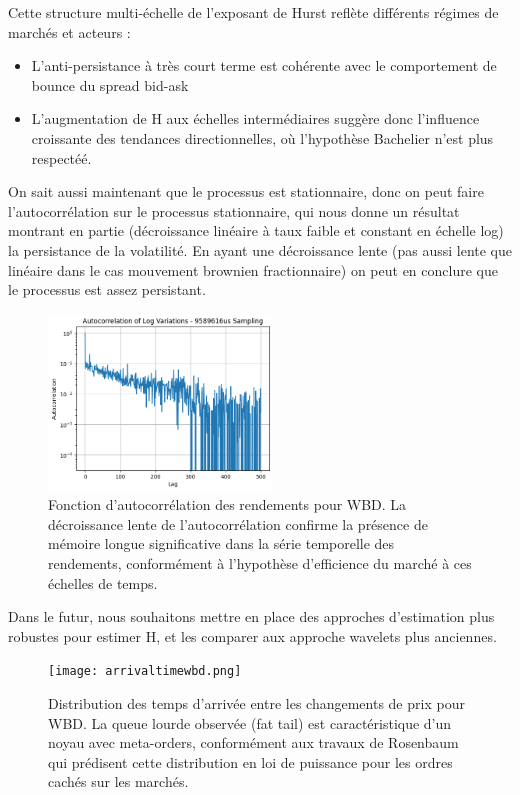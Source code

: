 \documentclass[10pt,a4paper]{article}
\theoremstyle{definition}
\theoremstyle{remark}
\begin{document}
\begin{itemize}
Cette structure multi-échelle de l'exposant de Hurst reflète différents régimes de marchés et acteurs :
\begin{itemize}
    \item L'anti-persistance à très court terme est cohérente avec le comportement de bounce du spread bid-ask
    \item L'augmentation de H aux échelles intermédiaires suggère donc l'influence croissante des tendances directionnelles, où l'hypothèse Bachelier n'est plus respectéé.
\end{itemize}


On sait aussi maintenant que le processus est stationnaire, donc on peut faire l'autocorrélation sur le processus stationnaire, qui nous donne un résultat montrant en partie
(décroissance linéaire à taux faible et constant en échelle log) la persistance de la volatilité. En ayant une décroissance lente (pas aussi lente que linéaire dans le cas mouvement brownien fractionnaire)
on peut en conclure que le processus est assez persistant.

\begin{figure}[h!]
    \centering
        \includegraphics[width=0.53\textwidth]{autocorr.png}
    \caption{Fonction d'autocorrélation des rendements pour WBD. La décroissance lente de l'autocorrélation confirme la présence de mémoire longue significative dans la série temporelle des rendements, conformément à l'hypothèse d'efficience du marché à ces échelles de temps.}
    \label{fig:autocorr_wbd}
\end{figure}



Dans le futur, nous souhaitons mettre en place des approches d'estimation plus robustes \cite{chong2024minimax, chong2024clt} pour estimer H, et les comparer aux approche wavelets plus anciennes. 

\begin{figure}[h!]
    \centering
        \texttt{[image: arrivaltimewbd.png]}
    \caption{Distribution des temps d'arrivée entre les changements de prix pour WBD. La queue lourde observée (fat tail) est caractéristique d'un noyau avec meta-orders, conformément aux travaux de Rosenbaum qui prédisent cette distribution en loi de puissance pour les ordres cachés sur les marchés.}
    \label{fig:arrival_times_wbd}
\end{figure}


\end{itemize}
\end{document}
